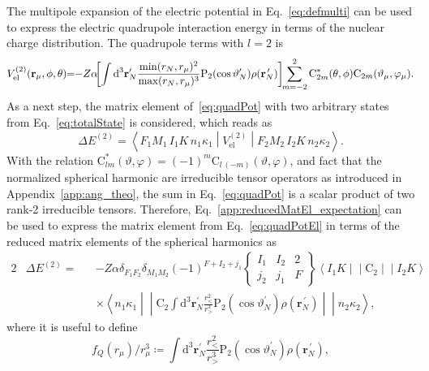 The multipole expansion of the electric potential in Eq.~\eqref{eq:defmulti} can be used to express the electric quadrupole interaction energy in terms of the nuclear charge distribution. The quadrupole terms with $l=2$ is
\begin{equation}
V^{(2)}_{\text{el}}(\mathbf{r}_\mu,\phi,\theta)\hspace{-3pt}=\hspace{-3pt}-Z\alpha\hspace{-4pt} \left[ \int \text{d}^3\mathbf{r}^{\prime}_N \frac{\min(r_N,r_\mu)^2}{\max(r_N,r_\mu)^{3}}\text{P}_{2}(\cos \vartheta_N^{\prime})\rho(\mathbf{r}_N^{\,\prime})\right]\hspace{-3pt}\sum_{m=-2}^2 \text{C}^*_{2m}(\theta,\phi)\text{C}_{2m}(\vartheta_\mu,\varphi_\mu).
\label{eq:quadPot}
\end{equation}
As a next step, the matrix element of~\eqref{eq:quadPot} with two arbitrary states from Eq.~\eqref{eq:totalState} is considered, which reads as
\begin{equation}
\Delta E^{(2)}=\left<F_1M_1\,I_1K \,n_1\kappa_1 \middle| V^{(2)}_{\text{el}} \middle|F_2M_2\,I_2K \,n_2\kappa_2 \right>.
\label{eq:quadPotEl}
\end{equation}
With the relation $\text{C}_{lm}^*(\vartheta,\varphi) =(-1)^m\text{C}_{l\,(-m)}(\vartheta,\varphi)$, and fact that the normalized spherical harmonic are irreducible tensor operators as introduced in Appendix~\ref{app:ang_theo}, the sum in Eq.~\eqref{eq:quadPot} is a scalar product of two rank-2 irreducible tensors. Therefore, Eq.~\eqref{app:reducedMatEl_expectation} can be used to express the matrix element from Eq.~\eqref{eq:quadPotEl} in terms of the reduced matrix elements of the spherical harmonics as
\begin{alignat}{2}
&\Delta E^{(2)} =&& -Z\alpha\delta_{F_1F_2}\delta_{M_1M_2} (-1)^{F+I_2+j_1}
\begin{Bmatrix}
I_1 & I_2 & 2 \\
j_2 & j_1&F
\end{Bmatrix}
\left<I_1K\middle|\middle|\text{C}_2 \middle|\middle| I_2 K \right>\\[7.5pt]
&&&\times\left<n_1\kappa_1\middle|\middle|\text{C}_2  \int \text{d}^3\mathbf{r}^{\prime}_N \frac{r_<^2}{r_>^{3}}\text{P}_{2}(\cos \vartheta_N^{\prime})\rho(\mathbf{r}_N^{\,\prime}) \middle|\middle| n_2\kappa_2 \right>,
\label{eq:quadNonDiagEl}
\end{alignat}
where it is useful to define
\begin{equation}
\label{eq:quadDistr}
f_Q(r_\mu)/r_\mu^3 \coloneqq \int \text{d}^3\mathbf{r}^{\prime}_N \frac{r_<^2}{r_>^{3}}\text{P}_{2}(\cos \vartheta_N^{\prime})\rho(\mathbf{r}_N^{\,\prime}),
\end{equation}
